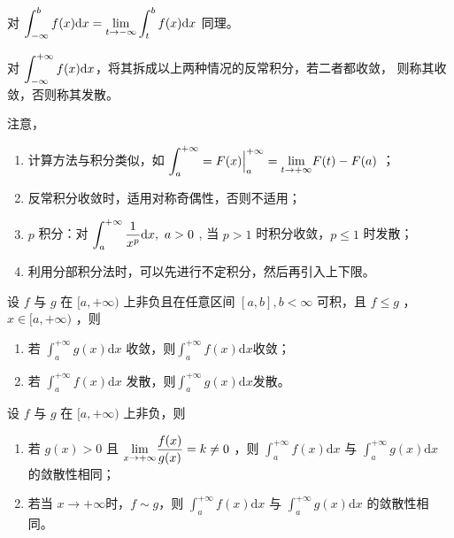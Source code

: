 对 $ \displaystyle \int_{-\infty}^b f(x)\mathrm{d}x = {\displaystyle\lim_{t\rightarrow -\infty}}
\int_t^b f(x)\mathrm{d}x $ 同理。\vspace{3pt}

对 $ \displaystyle \int_{-\infty}^{+\infty}f(x)\mathrm{d}x $，将其拆成以上两种情况的反常积分，若二者都收敛，
则称其收敛，否则称其发散。

注意，
\begin{enumerate}
    \item 计算方法与积分类似，如 $\displaystyle \int_a^{+\infty} = F(x)\Big|^{+\infty}_a = 
    {\displaystyle\lim_{t\rightarrow +\infty}}F(t) - F(a) $ ；
    \item 反常积分收敛时，适用对称奇偶性，否则不适用；
    \item $ p $ 积分：对 $ \displaystyle \int_a^{+\infty}\dfrac{1}{x^p}\mathrm{d}x,\ a>0 $ ,
    当 $ p > 1 $ 时积分收敛，$ p\leq 1 $ 时发散；
    \item 利用分部积分法时，可以先进行不定积分，然后再引入上下限。
\end{enumerate}

\begin{Theo}[比较判别法]

    设 $ f $ 与 $ g $ 在 $ [a,+\infty) $ 上非负且在任意区间 $ [a,b],b<\infty $ 可积，且 $ f \leq g $ ，
    $ x\in[a,+\infty) $ ，则\begin{enumerate}
        \item 若 $ \int_a^{+\infty}g(x)\mathrm{d}x $ 收敛，则$ \int_a^{+\infty}f(x)\mathrm{d}x $收敛；
        \item 若 $ \int_a^{+\infty}f(x)\mathrm{d}x $ 发散，则$ \int_a^{+\infty}g(x)\mathrm{d}x $发散。
    \end{enumerate}
\end{Theo}

\begin{Theo}[比较判别法]

    设 $ f $ 与 $ g $ 在 $ [a,+\infty) $ 上非负，则
    \begin{enumerate}
        \item 若 $ g(x) > 0 $ 且 $ \displaystyle {\displaystyle\lim_{x\rightarrow +\infty}}
        \dfrac{f(x)}{g(x)} = k \neq 0 $ ，则 $ \int_a^{+\infty}f(x)\mathrm{d}x $ 与
        $ \int_a^{+\infty}g(x)\mathrm{d}x $ 的敛散性相同；
        \item 若当 $ x\rightarrow+\infty $时，$ f\sim g $，则 $ \int_a^{+\infty}f(x)\mathrm{d}x $ 与
        $ \int_a^{+\infty}g(x)\mathrm{d}x $ 的敛散性相同。
    \end{enumerate}
\end{Theo}

